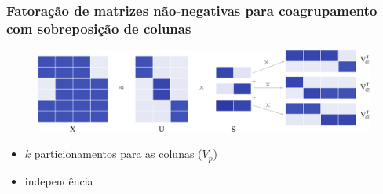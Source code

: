 \documentclass[10pt]{beamer}
\begin{document}


\begin{frame}
\frametitle{Fatoração de matrizes não-negativas para coagrupamento com sobreposição de colunas}

  \begin{figure}[H]
  \includegraphics[width=1.0\textwidth]{img/factorizationXUSV1tok.png}
  \end{figure}

  \begin{itemize}
    \item $k$ particionamentos para as colunas ($V_{p}$)
    \item independência
  \end{itemize}

\end{frame}
\end{document}
